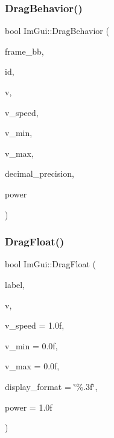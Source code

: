 \mbox{\label{namespace_im_gui_a4fdcba60dbe3762a144051add234ea48}} 
\subsubsection{\texorpdfstring{Drag\+Behavior()}{DragBehavior()}}
{\footnotesize\ttfamily bool Im\+Gui\+::\+Drag\+Behavior (\begin{DoxyParamCaption}\item[{const \mbox{\hyperlink{struct_im_rect}{Im\+Rect}} \&}]{frame\+\_\+bb,  }\item[{\mbox{\hyperlink{imgui_8h_a1785c9b6f4e16406764a85f32582236f}{Im\+Gui\+ID}}}]{id,  }\item[{float $\ast$}]{v,  }\item[{float}]{v\+\_\+speed,  }\item[{float}]{v\+\_\+min,  }\item[{float}]{v\+\_\+max,  }\item[{int}]{decimal\+\_\+precision,  }\item[{float}]{power }\end{DoxyParamCaption})}

\mbox{\label{namespace_im_gui_ac62335909eaaa63a1ead0226e836baeb}} 
\subsubsection{\texorpdfstring{Drag\+Float()}{DragFloat()}}
{\footnotesize\ttfamily bool Im\+Gui\+::\+Drag\+Float (\begin{DoxyParamCaption}\item[{const char $\ast$}]{label,  }\item[{float $\ast$}]{v,  }\item[{float}]{v\+\_\+speed = {\ttfamily 1.0f},  }\item[{float}]{v\+\_\+min = {\ttfamily 0.0f},  }\item[{float}]{v\+\_\+max = {\ttfamily 0.0f},  }\item[{const char $\ast$}]{display\+\_\+format = {\ttfamily \char`\"{}\%.3f\char`\"{}},  }\item[{float}]{power = {\ttfamily 1.0f} }\end{DoxyParamCaption})}


